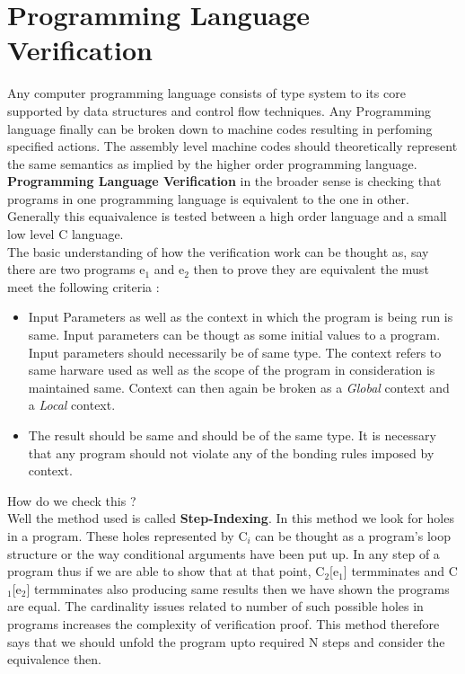 \chapter{Programming Language Verification }
\graphicspath{ {./images/} }

Any computer programming language consists of type system to its core supported by data structures and control flow techniques. Any Programming language finally can be broken down to machine codes resulting in perfoming specified actions. The assembly level machine codes should theoretically represent the same semantics as implied by the higher order programming language. \textbf{Programming Language Verification} in the broader sense is checking that programs in one programming language is equivalent to the one in other. Generally this equaivalence is tested between a high order	language and a small low level C language. \\

The basic understanding of how the verification work can be thought as, say there are two programs e$_1$ and e$_2$ then to prove they are equivalent the must meet the following criteria :

\begin{itemize}

\item{
	Input Parameters as well as the context in which the program is being run is same. Input parameters can be thougt as some initial values to a program. Input parameters should necessarily be of same type. The context refers to same harware used as well as the scope of the program in consideration is maintained same. Context can then again be broken as a \textit{Global} context and a \textit{Local} context. 
}

\item{
	The result should be same and should be of the same type. It is necessary that any program should not violate any of the bonding rules imposed by context.
}

\end{itemize}    

How do we check this ?\\

Well the method used is called \textbf{Step-Indexing}. In this method we look for holes in a program. These holes represented by C$_i$ can be thought as a program's loop structure or the way conditional arguments have been put up. In any step of a program thus if we are able to show that at that point, C$_2$[e$_1$] termminates and C$_1$[e$_2$] termminates also producing same results then we have shown the programs are equal. The cardinality issues related to number of such possible holes in programs increases the complexity of verification proof. This method therefore says that we should unfold the program upto required N steps and consider the equivalence then.\\

